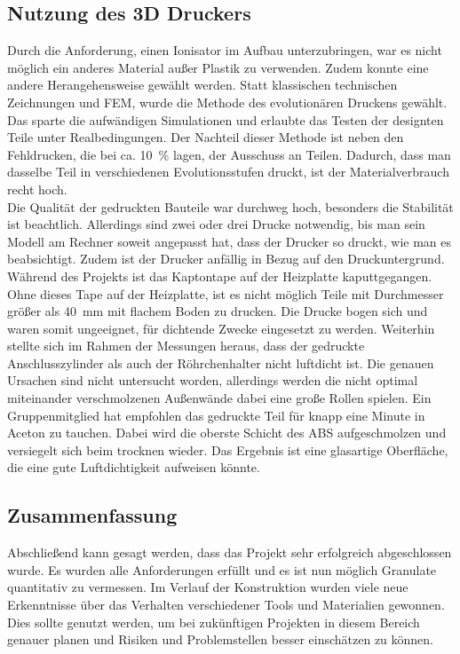 \subsection{Nutzung des 3D Druckers}

Durch die Anforderung, einen Ionisator im Aufbau unterzubringen, war es nicht möglich ein anderes Material außer Plastik zu verwenden. Zudem konnte eine andere Herangehensweise gewählt werden. Statt klassischen technischen Zeichnungen und FEM, wurde die Methode des evolutionären Druckens gewählt. Das sparte die aufwändigen Simulationen und erlaubte das Testen der designten Teile unter Realbedingungen. Der Nachteil dieser Methode ist neben den  Fehldrucken, die bei ca. \SI{10}{\%} lagen, der Ausschuss an Teilen. Dadurch, dass man dasselbe Teil in verschiedenen Evolutionsstufen druckt, ist der Materialverbrauch recht hoch. \\
Die Qualität der gedruckten Bauteile war durchweg hoch, besonders die Stabilität ist beachtlich. Allerdings sind zwei oder drei Drucke notwendig, bis man sein Modell am Rechner soweit angepasst hat, dass der Drucker so druckt, wie man es beabsichtigt. Zudem ist der Drucker anfällig in Bezug auf den Druckuntergrund. Während des Projekts ist das Kaptontape auf der Heizplatte kaputtgegangen. Ohne dieses Tape auf der Heizplatte, ist es nicht möglich Teile mit Durchmesser größer als \SI{40}{mm} mit flachem Boden zu drucken. Die Drucke bogen sich und waren somit ungeeignet, für dichtende Zwecke eingesetzt zu werden. Weiterhin stellte sich im Rahmen der Messungen heraus, dass der gedruckte Anschlusszylinder als auch der Röhrchenhalter nicht luftdicht ist. Die genauen Ursachen sind nicht untersucht worden, allerdings werden die nicht optimal miteinander verschmolzenen Außenwände dabei eine große Rollen spielen.
Ein Gruppenmitglied hat empfohlen das gedruckte Teil für knapp eine Minute in Aceton zu tauchen. Dabei wird die oberste Schicht des ABS aufgeschmolzen und versiegelt sich beim trocknen wieder. Das Ergebnis ist eine glasartige Oberfläche, die eine gute Luftdichtigkeit aufweisen könnte. 


\subsection{Zusammenfassung}

Abschließend kann gesagt werden, dass das Projekt sehr erfolgreich abgeschlossen wurde. Es wurden alle Anforderungen erfüllt und es ist nun möglich Granulate quantitativ zu vermessen.
Im Verlauf der Konstruktion wurden viele neue Erkenntnisse über das Verhalten verschiedener Tools und Materialien gewonnen. Dies sollte genutzt werden, um bei zukünftigen Projekten in diesem Bereich genauer planen und Risiken und Problemstellen besser einschätzen zu können.




